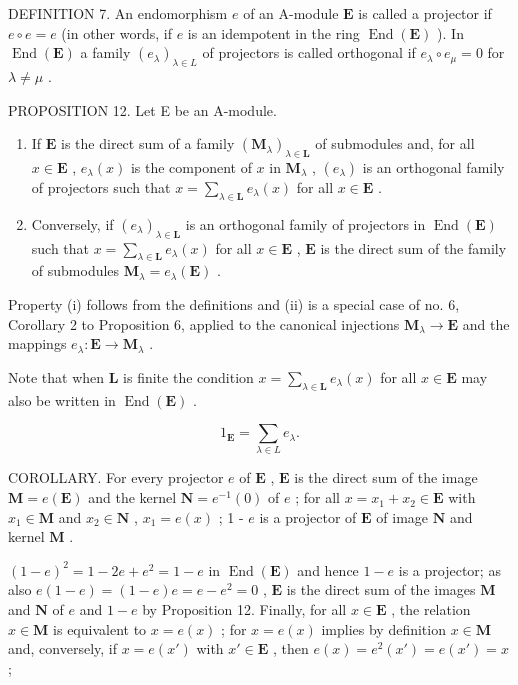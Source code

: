 DEFINITION 7. An endomorphism \(e\) of an A-module \(\mathbf{E}\) is called a projector if \(e \circ e = e\) (in other words, if \(e\) is an idempotent in the ring \(\operatorname{End}(\mathbf{E})\) ). In \(\operatorname{End}(\mathbf{E})\) a family \((e_{\lambda})_{\lambda \in L}\) of projectors is called orthogonal if \(e_{\lambda} \circ e_{\mu} = 0\) for \(\lambda \neq \mu\) .

PROPOSITION 12. Let E be an A-module.

\begin{enumerate}
\def\labelenumi{(\roman{enumi})}
\item
  If \(\mathbf{E}\) is the direct sum of a family \((\mathbf{M}_{\lambda})_{\lambda \in \mathbf{L}}\) of submodules and, for all \(x \in \mathbf{E}\) , \(e_{\lambda}(x)\) is the component of \(x\) in \(\mathbf{M}_{\lambda}\) , \((e_{\lambda})\) is an orthogonal family of projectors such that \(x = \sum_{\lambda \in \mathbf{L}} e_{\lambda}(x)\) for all \(x \in \mathbf{E}\) .
\item
  Conversely, if \((e_{\lambda})_{\lambda \in \mathbf{L}}\) is an orthogonal family of projectors in \(\operatorname{End}(\mathbf{E})\) such that \(x = \sum_{\lambda \in \mathbf{L}} e_{\lambda}(x)\) for all \(x \in \mathbf{E}\) , \(\mathbf{E}\) is the direct sum of the family of submodules \(\mathbf{M}_{\lambda} = e_{\lambda}(\mathbf{E})\) .
\end{enumerate}

Property (i) follows from the definitions and (ii) is a special case of no. 6, Corollary 2 to Proposition 6, applied to the canonical injections \(\mathbf{M}_{\lambda} \to \mathbf{E}\) and the mappings \(e_{\lambda}: \mathbf{E} \to \mathbf{M}_{\lambda}\) .

Note that when \(\mathbf{L}\) is finite the condition \(x = \sum_{\lambda \in \mathbf{L}} e_{\lambda}(x)\) for all \(x \in \mathbf{E}\) may also be written in \(\operatorname{End}(\mathbf{E})\) .

\[
1 _ {\mathbf {E}} = \sum_ {\lambda \in L} e _ {\lambda}.\tag{31}
\]

COROLLARY. For every projector \(e\) of \(\mathbf{E}\) , \(\mathbf{E}\) is the direct sum of the image \(\mathbf{M} = e(\mathbf{E})\) and the kernel \(\mathbf{N} = e^{-1}(0)\) of \(e\) ; for all \(x = x_1 + x_2 \in \mathbf{E}\) with \(x_1 \in \mathbf{M}\) and \(x_2 \in \mathbf{N}\) , \(x_1 = e(x)\) ; 1 - \(e\) is a projector of \(\mathbf{E}\) of image \(\mathbf{N}\) and kernel \(\mathbf{M}\) .

\((1 - e)^2 = 1 - 2e + e^2 = 1 - e\) in \(\operatorname{End}(\mathbf{E})\) and hence \(1 - e\) is a projector; as also \(e(1 - e) = (1 - e)e = e - e^2 = 0\) , \(\mathbf{E}\) is the direct sum of the images \(\mathbf{M}\) and \(\mathbf{N}\) of \(e\) and \(1 - e\) by Proposition 12. Finally, for all \(x \in \mathbf{E}\) , the relation \(x \in \mathbf{M}\) is equivalent to \(x = e(x)\) ; for \(x = e(x)\) implies by definition \(x \in \mathbf{M}\) and, conversely, if \(x = e(x')\) with \(x' \in \mathbf{E}\) , then \(e(x) = e^2(x') = e(x') = x\) ;

